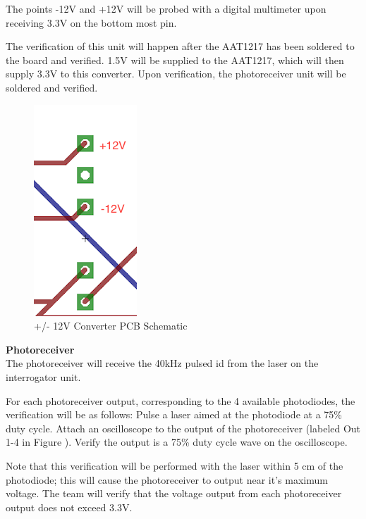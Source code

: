\documentclass[letterpaper,10pt]{article}
\begin{document}
\begin{spacing}{1.15}
The points -12V and +12V will be probed with a digital multimeter upon receiving 3.3V on the bottom most pin.  

The verification of this unit will happen after the AAT1217 has been soldered to the board and verified. 1.5V will be supplied to the AAT1217, which will then supply 3.3V to this converter. Upon verification, the photoreceiver unit will be soldered and verified.
\begin{figure} [H]
	\centering
	\includegraphics[scale=0.8]{12vconverter.png}
	\caption{+/- 12V Converter PCB Schematic\label{fig:converter-pcb}}
\end{figure}

\normalsize\textbf{Photoreceiver} \\
The photoreceiver will receive the 40kHz pulsed id from the laser on the interrogator unit. 

For each photoreceiver output, corresponding to the 4 available photodiodes, the verification will be as follows: Pulse a laser aimed at the photodiode at a 75\% duty cycle. Attach an oscilloscope to the output of the photoreceiver (labeled Out 1-4 in Figure \label{fig:photodiode-pcb}). Verify the output is a 75\% duty cycle wave on the oscilloscope. 

Note that this verification will be performed with the laser within 5 cm of the photodiode; this will cause the photoreceiver to output near it's maximum voltage. The team will verify that the voltage output from each photoreceiver output does not exceed 3.3V. 


\end{spacing}
\end{document}
